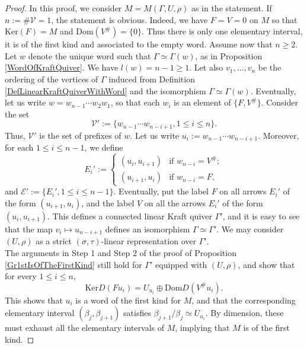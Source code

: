 \documentclass[12pt]{amsart}
\theoremstyle{definition}
\newcommand{\<}{\langle}   %
\renewcommand{\>}{\rangle} %
\begin{document}
\begin{proof}
    In this proof, we consider $M = M(\Gamma,U,\rho)$ as in the statement. If $n := \#\mathcal V = 1$, the statement is obvious. Indeed, we have $F=V=0$ on $M$ so that $\mathrm{Ker}(F) = M$ and $\mathrm{Dom}(V^{\#}) = \{0\}$. Thus there is only one elementary interval, it is of the first kind and associated to the empty word. Assume now that $n\geq 2$. Let $w$ denote the unique word such that $\Gamma \simeq \Gamma(w)$, as in Proposition \ref{WordOfKraftQuiver}. We have $l(w) = n-1 \geq 1$. Let also $v_1, \ldots , v_n$ be the ordering of the vertices of $\Gamma$ induced from Definition \ref{DefLinearKraftQuiverWithWord} and the isomorphism $\Gamma \simeq \Gamma(w)$. Eventually, let us write $w = w_{n-1}\cdots w_{2}w_{1}$, so that each $w_i$ is an element of $\{F,V^{\#}\}$. Consider the set 
    \begin{equation*}
        \mathcal V' := \{w_{n-1}\cdots w_{n-i+1}, 1 \leq i \leq n\}.
    \end{equation*}
    Thus, $\mathcal V'$ is the set of prefixes of $w$. Let us write $u_i := w_{n-1}\cdots w_{n-i+1}$. Moreover, for each $1 \leq i \leq n-1$, we define 
    \begin{equation*}
        E_i' := \begin{cases}
            (u_i,u_{i+1}) & \text{if } w_{n-i} = V^{\#};\\
            (u_{i+1},u_i) & \text{if } w_{n-i} = F,
        \end{cases}
    \end{equation*}
    and $\mathcal E' := \{E_i', 1 \leq i \leq n-1\}$. Eventually, put the label $F$ on all arrows $E_i'$ of the form $(u_{i+1},u_i)$, and the label $V$ on all the arrows $E_i'$ of the form $(u_i,u_{i+1})$. This defines a connected linear Kraft quiver $\Gamma'$, and it is easy to see that the map $v_i \mapsto u_{n-i+1}$ defines an isomorphism $\Gamma \simeq \Gamma'$. We may consider $(U,\rho)$ as a strict $(\sigma,\tau)$-linear representation over $\Gamma'$.\\
    The arguments in Step 1 and Step 2 of the proof of Proposition \ref{Gr1stIsOfTheFirstKind} still hold for $\Gamma'$ equipped with $(U,\rho)$, and show that for every $1 \leq i \leq n$,
    \begin{equation*}
        \mathrm{Ker} D(Fu_i) = U_{u_i} \oplus \mathrm{Dom} D(V^{\#}u_i).
    \end{equation*}
    This shows that $u_i$ is a word of the first kind for $M$, and that the corresponding elementary interval $(\beta_j,\beta_{j+1})$ satisfies $\beta_{j+1}/\beta_j \simeq U_{u_i}$. By dimension, these must exhaust all the elementary intervals of $M$, implying that $M$ is of the first kind. 
\end{proof}
\end{document}
